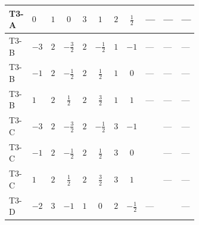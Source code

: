 \documentclass[8pt]{article}
\begin{document}
\begin{landscape}
\begin{longtable}{@{}llcccccc >{\raggedright\arraybackslash}p{0.21\linewidth} >{\raggedright\arraybackslash}p{0.21\linewidth} >{\raggedright\arraybackslash}p{0.21\linewidth}@{}}
\midrule
T3-A & $0$ & $1$ & $0$ & $3$ & $1$ & $2$ & $\frac{1}{2}$ & --- & --- & --- \\
\midrule
T3-B & $-3$ & $2$ & $-\frac{3}{2}$ & $2$ & $-\frac{1}{2}$ & $1$ & $-1$ & --- & --- & --- \\
\midrule
T3-B & $-1$ & $2$ & $-\frac{1}{2}$ & $2$ & $\frac{1}{2}$ & $1$ & $0$ & --- & --- & --- \\
\midrule
T3-B & $1$ & $2$ & $\frac{1}{2}$ & $2$ & $\frac{3}{2}$ & $1$ & $1$ & --- & --- & --- \\
\midrule
T3-C & $-3$ & $2$ & $-\frac{3}{2}$ & $2$ & $-\frac{1}{2}$ & $3$ & $-1$ & \scriptsize\adjustbox{max width=\linewidth}{$\begin{gathered} {\lambda_5} \left(\frac{3}{2} T_{\nu}^{(1)}+\frac{3}{2} T_{\nu}^{(2)}+6 \operatorname{Tr}\!\left({Y_d}\,\left({Y_d}\right)^{\dagger}\right)+2 \operatorname{Tr}\!\left({Y_e}\,\left({Y_e}\right)^{\dagger}\right)+6 \operatorname{Tr}\!\left({Y_u}\,\left({Y_u}\right)^{\dagger}\right)+\frac{{\lambda_{12}^{(A)}}}{6}+\frac{2 {\lambda_{HS_1}^{(A)}}}{3}+2 {\lambda_{HS_2}^{(A)}}\right)\end{gathered}$} & --- & --- \\
\midrule
T3-C & $-1$ & $2$ & $-\frac{1}{2}$ & $2$ & $\frac{1}{2}$ & $3$ & $0$ & \scriptsize\adjustbox{max width=\linewidth}{$\begin{gathered} {\lambda_5} \left(\frac{3}{2} T_{\nu}^{(1)}+\frac{3}{2} T_{\nu}^{(2)}+6 \operatorname{Tr}\!\left({Y_d}\,\left({Y_d}\right)^{\dagger}\right)+2 \operatorname{Tr}\!\left({Y_e}\,\left({Y_e}\right)^{\dagger}\right)+6 \operatorname{Tr}\!\left({Y_u}\,\left({Y_u}\right)^{\dagger}\right)+\frac{{\lambda_{12}^{(A)}}}{6}+\frac{2 {\lambda_{HS_1}^{(A)}}}{3}+2 {\lambda_{HS_2}^{(A)}}\right)\end{gathered}$} & --- & --- \\
\midrule
T3-C & $1$ & $2$ & $\frac{1}{2}$ & $2$ & $\frac{3}{2}$ & $3$ & $1$ & \scriptsize\adjustbox{max width=\linewidth}{$\begin{gathered} {\lambda_5} \left(\frac{3}{2} T_{\nu}^{(1)}+\frac{3}{2} T_{\nu}^{(2)}+6 \operatorname{Tr}\!\left({Y_d}\,\left({Y_d}\right)^{\dagger}\right)+2 \operatorname{Tr}\!\left({Y_e}\,\left({Y_e}\right)^{\dagger}\right)+6 \operatorname{Tr}\!\left({Y_u}\,\left({Y_u}\right)^{\dagger}\right)+\frac{{\lambda_{12}^{(A)}}}{6}+\frac{2 {\lambda_{HS_1}^{(A)}}}{3}+2 {\lambda_{HS_2}^{(A)}}\right)\end{gathered}$} & --- & --- \\
\midrule
T3-D & $-2$ & $3$ & $-1$ & $1$ & $0$ & $2$ & $-\frac{1}{2}$ & --- & \scriptsize\adjustbox{max width=\linewidth}{$\begin{gathered} {\lambda_5} (T_{\nu}^{(1)}+2 T_{\nu}^{(2)}+6 \operatorname{Tr}\!\left({Y_d}\,\left({Y_d}\right)^{\dagger}\right)+2 \operatorname{Tr}\!\left({Y_e}\,\left({Y_e}\right)^{\dagger}\right)+6 \operatorname{Tr}\!\left({Y_u}\,\left({Y_u}\right)^{\dagger}\right)-4 {\lambda_{HS_1}^{(A)}})\end{gathered}$} & --- \\

\end{longtable}
\end{landscape}
\end{document}
